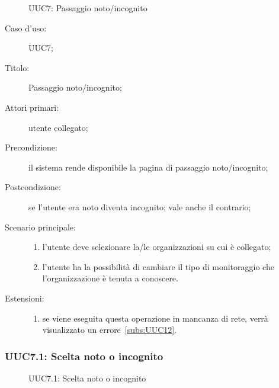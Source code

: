 \documentclass[../../../analisi-dei-requisiti.tex]{subfiles}
\begin{document}
\begin{figure}[H]
  \centering
  \caption{UUC7: Passaggio noto/incognito}%
  \label{fig:uuc7}
\end{figure}

\begin{description}
  \item[Caso d’uso:] UUC7;
  \item[Titolo:] Passaggio noto/incognito;
  \item[Attori primari:] utente collegato;
  \item[Precondizione:] il sistema rende disponibile la pagina di passaggio noto/incognito;
  \item[Postcondizione:] se l'utente era noto diventa incognito; vale anche il contrario;
  \item[Scenario principale:]
        \begin{enumerate}
          \item l'utente deve selezionare la/le organizzazioni su cui è collegato;
          \item l'utente ha la possibilità di cambiare il tipo di monitoraggio che l'organizzazione è tenuta a conoscere.
        \end{enumerate}
  \item[Estensioni:]
        \begin{enumerate}
          \item se viene eseguita questa operazione in mancanza di rete, verrà visualizzato un errore~\ref{subs:UUC12}.
        \end{enumerate}
\end{description}

\subsubsection{UUC7.1: Scelta noto o incognito}%
\label{subs:UUC7.1}

\begin{figure}[H]
  \centering
  \caption{UUC7.1: Scelta noto o incognito}%
  \label{fig:uuc7_1}
\end{figure}
\end{document}
